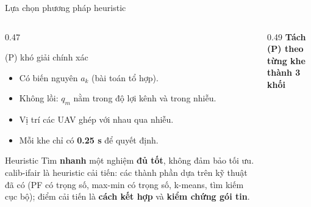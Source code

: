 \documentclass[aspectratio=169,10pt,t]{beamer}
\newcommand{\hl}[1]{\textcolor{MainBlue}{\textbf{#1}}}
\newcommand{\SE}{\widehat{SE}}
\begin{document}
\begin{frame}{Lựa chọn phương pháp heuristic}
\begin{columns}[T,onlytextwidth]
\begin{column}{0.47\textwidth}
\vspace{0pt}
  \begin{block}{(P) khó giải chính xác}
    \small
    \begin{itemize}
      \item Có biến nguyên $a_k$ (bài toán tổ hợp).
      \item Không lồi: $q_m$ nằm trong độ lợi kênh và trong nhiễu.
      \item Vị trí các UAV ghép với nhau qua nhiễu.
      \item Mỗi khe chỉ có \hl{0.25 s} để quyết định.
    \end{itemize}
  \end{block}
  \begin{block}{Heuristic}
    \small
    Tìm \textbf{nhanh} một nghiệm \textbf{đủ tốt}, không đảm bảo tối ưu. calib-ifair là heuristic cải tiến:
    các thành phần dựa trên kỹ thuật đã có (PF có trọng số, max-min có trọng số, k-means, tìm kiếm cục bộ); điểm cải tiến là \hl{cách kết hợp} và \hl{kiểm chứng gói tin}.
  \end{block}
\end{column}
\begin{column}{0.49\textwidth}
\vspace{0pt}
  \centering
  \textbf{\small Tách (P) theo từng khe thành 3 khối}
  \vspace{3mm}

\end{column}
\end{columns}
\end{frame}
\end{document}
